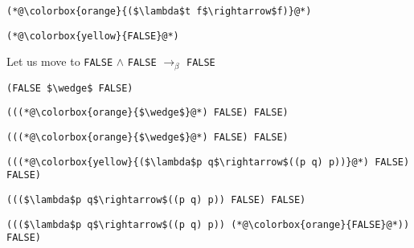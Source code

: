 \documentclass{beamer}
\begin{document}
\begin{frame}[fragile]{\CurrentSection}
\lstset{basicstyle=\ttfamily\small}\lstset{numbers=none}\lstset{language=ML}\begin{lstlisting}
(*@\colorbox{orange}{($\lambda$t f$\rightarrow$f)}@*)
\end{lstlisting}
\pause\lstset{language=ML}\begin{lstlisting}
(*@\colorbox{yellow}{FALSE}@*)
\end{lstlisting}

\end{frame}

\begin{frame}[fragile]{\CurrentSection}
\begin{block}{\CurrentSubSection}
Let us move to \texttt{FALSE} $\wedge$ \texttt{FALSE} $\rightarrow_\beta$ \texttt{FALSE}
\end{block}


\end{frame}

\begin{frame}[fragile]{\CurrentSection}
\lstset{basicstyle=\ttfamily\small}\lstset{numbers=none}\lstset{language=ML}\begin{lstlisting}
(FALSE $\wedge$ FALSE)
\end{lstlisting}
\pause\lstset{language=ML}\begin{lstlisting}
(((*@\colorbox{orange}{$\wedge$}@*) FALSE) FALSE)
\end{lstlisting}

\end{frame}

\begin{frame}[fragile]{\CurrentSection}
\lstset{basicstyle=\ttfamily\small}\lstset{numbers=none}\lstset{language=ML}\begin{lstlisting}
(((*@\colorbox{orange}{$\wedge$}@*) FALSE) FALSE)
\end{lstlisting}
\pause\lstset{language=ML}\begin{lstlisting}
(((*@\colorbox{yellow}{($\lambda$p q$\rightarrow$((p q) p))}@*) FALSE) FALSE)
\end{lstlisting}

\end{frame}

\begin{frame}[fragile]{\CurrentSection}
\lstset{basicstyle=\ttfamily\small}\lstset{numbers=none}\lstset{language=ML}\begin{lstlisting}
((($\lambda$p q$\rightarrow$((p q) p)) FALSE) FALSE)
\end{lstlisting}
\pause\lstset{language=ML}\begin{lstlisting}
((($\lambda$p q$\rightarrow$((p q) p)) (*@\colorbox{orange}{FALSE}@*)) FALSE)
\end{lstlisting}

\end{frame}
\end{document}
